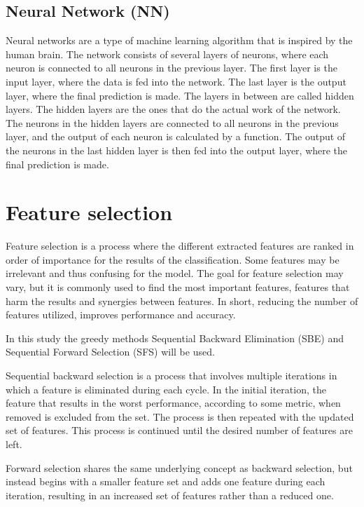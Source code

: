 \documentclass{kththesis}
\begin{document}
\subsection{Neural Network (NN)}

Neural networks are a type of machine learning algorithm that is inspired by the human brain. The network consists of several layers of neurons, where each neuron is connected to all neurons in the previous layer. The first layer is the input layer, where the data is fed into the network. The last layer is the output layer, where the final prediction is made. The layers in between are called hidden layers. The hidden layers are the ones that do the actual work of the network. The neurons in the hidden layers are connected to all neurons in the previous layer, and the output of each neuron is calculated by a function. The output of the neurons in the last hidden layer is then fed into the output layer, where the final prediction is made.

\section{Feature selection}


Feature selection is a process where the different extracted features are ranked in order of importance for the results of the classification. Some features may be irrelevant and thus confusing for the model. The goal for feature selection may vary, but it is commonly used to find the most important features, features that harm the results and synergies between features. In short, reducing the number of features utilized, improves performance and accuracy. %

In this study the greedy methods Sequential Backward Elimination (SBE) and Sequential Forward Selection (SFS) will be used.

Sequential backward selection is a process that involves multiple iterations in which a feature is eliminated during each cycle. In the initial iteration, the feature that results in the worst performance, according to some metric, when removed is excluded from the set. The process is then repeated with the updated set of features. This process is continued until the desired number of features are left. %

Forward selection shares the same underlying concept as backward selection, but instead begins with a smaller feature set and adds one feature during each iteration, resulting in an increased set of features rather than a reduced one.
\end{document}
